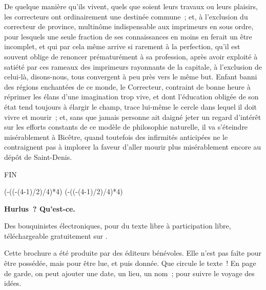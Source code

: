 \documentclass[french,twoside]{book} %
\def\truncdiv#1#2{((#1-(#2-1)/2)/#2)}
\def\moduloop#1#2{(#1-\truncdiv{#1}{#2}*#2)}
\def\modulo#1#2{\number\numexpr\moduloop{#1}{#2}\relax}
\begin{document}
De quelque manière qu’ils vivent, quels que soient leurs travaux ou leurs plaisirs, les correcteurs ont ordinairement une destinée commune ; et, à l’exclusion du correcteur de province, multinôme indispensable aux imprimeurs en sous ordre, pour lesquels une seule fraction de ses connaissances en moins en ferait un être incomplet, et qui par cela même arrive si rarement à la perfection, qu’il est souvent oblige de renoncer prématurément à sa profession, après avoir  exploité à satiété par ces rameaux des imprimeurs rayonnants de la capitale, à l’exclusion de celui-là, disons-nous, tous convergent à peu près vers le même but. Enfant banni des régions enchantées de ce monde, le Correcteur, contraint de bonne heure à réprimer les élans d’une imagination trop vive, et dont l’éducation obligée de son état tend toujours à élargir le champ, trace lui-même le cercle dans lequel il doit vivre et mourir ; et, sans que jamais personne ait daigné jeter un regard d’intérêt sur les efforts constants de ce modèle de philosophie naturelle, il va s’éteindre misérablement à Bicêtre, quand toutefois des infirmités anticipées ne le contraignent pas à implorer la faveur d’aller mourir plus misérablement encore au dépôt de Saint-Denis.\par


\begin{raggedleft}FIN\end{raggedleft}
 


\ifbooklet
  \pagestyle{empty}
  \clearpage
  \ifnum\modulo{\value{page}}{4}=0 \hbox{}\newpage\hbox{}\newpage\fi
  \ifnum\modulo{\value{page}}{4}=1 \hbox{}\newpage\hbox{}\newpage\fi


  \hbox{}\newpage
  \ifodd\value{page}\hbox{}\newpage\fi
  {\centering\color{rubric}\bfseries\noindent\large
    Hurlus ? Qu’est-ce.\par
    \bigskip
  }
  \noindent Des bouquinistes électroniques, pour du texte libre à participation libre,
  téléchargeable gratuitement sur \href{https://hurlus.fr}{}.\par
  \bigskip
  \noindent Cette brochure a été produite par des éditeurs bénévoles.
  Elle n’est pas faîte pour être possédée, mais pour être lue, et puis donnée.
  Que circule le texte !
  En page de garde, on peut ajouter une date, un lieu, un nom ; pour suivre le voyage des idées.
  \par
\end{document}
